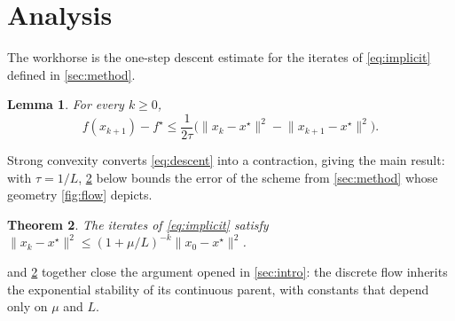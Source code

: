 \documentclass[11pt]{amsart}
\theoremstyle{plain}
\newtheorem{theorem}{Theorem}
\newtheorem{lemma}[theorem]{Lemma}
\begin{document}
\section{Analysis}
\label{sec:analysis}

The workhorse is the one-step descent estimate for the iterates of
\cref{eq:implicit} defined in \cref{sec:method}.

\begin{lemma}
  \label{lem:descent}
  For every $k \ge 0$,
  \begin{equation}
    \label{eq:descent}
    f(x_{k+1}) - f^\star \le \frac{1}{2\tau}
      \bigl(\lVert x_k - x^\star \rVert^2
      - \lVert x_{k+1} - x^\star \rVert^2\bigr).
  \end{equation}
\end{lemma}

Strong convexity converts \cref{eq:descent} into a contraction, giving the
main result: with $\tau = 1/L$, \cref{thm:linear} below bounds the error of
the scheme from \cref{sec:method} whose geometry \cref{fig:flow} depicts.

\begin{theorem}
  \label{thm:linear}
  The iterates of \cref{eq:implicit} satisfy
  $\lVert x_k - x^\star \rVert^2 \le (1 + \mu/L)^{-k}
  \lVert x_0 - x^\star \rVert^2$.
\end{theorem}

 and \cref{thm:linear} together close the argument opened
in \cref{sec:intro}: the discrete flow inherits the exponential stability of
its continuous parent, with constants that depend only on $\mu$ and $L$.
\end{document}
